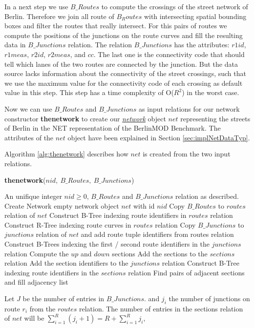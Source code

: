 \documentclass[a4paper]{article}
\newcommand{\bmodb} {BerlinMOD Benchmark}
\newcommand{\op}[1]{\textbf{#1}}
\newcommand{\dt}[1]{\textsl{\underline{#1}}}
\begin{document}
In a next step we use $B\_Routes$ to compute the crossings of the street network
of Berlin. Therefore we join all route of $B_Routes$ with intersecting spatial
bounding boxes and filter the routes that really intersect. For this pairs of
routes we compute the positions of the junctions on the route curves and fill
the resulting data in $B\_Junctions$ relation. The relation $B\_Junctions$ has the
attributes: $r1id$, $r1meas$, $r2id$, $r2meas$, and $cc$. The last one is the
connectivity code that should tell which lanes of the two routes are connected
by the junction. But the data source lacks information about the connectivity
of the street crossings, such that we use the maximum value for the connectivity
code of each crossing as default value in this step. This step has a time
complexity of O($R^2$) in the worst case.

Now we can use $B\_Routes$ and $B\_Junctions$ as input relations for our network
constructor \op{thenetwork} to create our \dt{network} object $net$ representing
the streets of Berlin in the NET representation of the \bmodb{}. The attributes
of the $net$ object have been explained in Section \ref{sec:implNetDataTyp}.

Algorithm \ref{alg:thenetwork} describes how $net$ is created from the two input
relations.
\begin{algorithm}[H]
\caption{\op{thenetwork}($nid,\ B\_Routes,\ B\_Junctions$)}
\label{alg:thenetwork}
\begin{algorithmic}[1]
\REQUIRE An unifique integer $nid \geq 0$, $B\_Routes$ and $B\_Junctions$ relation
as described.
\STATE Create Network empty network object $net$ with id $nid$
\STATE Copy $B\_Routes$ to $routes$ relation of $net$
\STATE Construct B-Tree indexing route identifiers in $routes$ relation
\STATE Construct R-Tree indexing route curves in $routes$ relation
\STATE Copy $B\_Junctions$ to $junctions$ relation of $net$ and add route tuple identifiers from routes relation
\STATE Construct B-Trees indexing the first / second route identifiers in the $junctions$ relation
    \STATE Compute the $up$ and $down$ sections
    \STATE Add the sections to the $sections$ relation
    \STATE Add the section identifiers to the $junctions$ relation
  \ENDFOR
\ENDFOR
\STATE Construct B-Tree indexing route identifiers in the $sections$ relation
  \STATE Find pairs of adjacent sections and fill adjacency list
\ENDFOR
\end{algorithmic}
\end{algorithm}
Let $J$ be the number of entries in $B\_Junctions$. and $j_i$ the number of
junctions on route $r_i$ from the $routes$ relation. The number of entries in the
sections relation of $net$ will be $\sum_{i=1}^{R}({j_i + 1}) = R + \sum_{i=1}^{R}{j_i}$,
\end{document}
